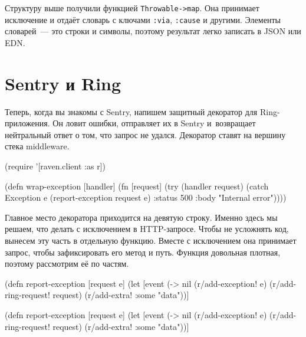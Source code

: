 
Структуру выше получили функцией \texttt{Throw\-able->map}. Она принимает
исключение и отдаёт словарь с ключами \verb|:via|, \verb|:cause| и
другими. Элементы словарей~--- это строки и символы, поэтому результат легко
записать в JSON или EDN.

\section{Sentry и Ring}


Теперь, когда вы знакомы с Sentry, напишем защитный декоратор для
Ring-приложения. Он ловит ошибки, отправляет их в Sentry и~возвращает
нейтральный ответ о том, что запрос не удался. Декоратор ставят на вершину стека
middleware.

\begin{english}
  \begin{clojure/lines}
(require '[raven.client :as r])

(defn wrap-exception
  [handler]
  (fn [request]
    (try
      (handler request)
      (catch Exception e
        (report-exception request e)
        {:status 500
         :body "Internal error"}))))
  \end{clojure/lines}
\end{english}

Главное место декоратора приходится на девятую строку. Именно здесь мы решаем,
что делать с исключением в HTTP-запросе. Чтобы не усложнять код, вынесем эту
часть в отдельную функцию. Вместе с исключением она принимает запрос, чтобы
зафиксировать его метод и путь. Функция довольная плотная, поэтому рассмотрим её
по частям.

\ifx\DEVICETYPE\MOBILE

\begin{english}
  \begin{clojure/lines}
(defn report-exception [request e]
 (let
   [event
    (-> nil
     (r/add-exception! e)
     (r/add-ring-request! request)
     (r/add-extra! {:some "data"}))]
  \end{clojure/lines}
\end{english}

\else

\begin{english}
  \begin{clojure/lines}
(defn report-exception [request e]
  (let [event (-> nil
                  (r/add-exception! e)
                  (r/add-ring-request! request)
                  (r/add-extra! {:some "data"}))]
  \end{clojure/lines}
\end{english}

